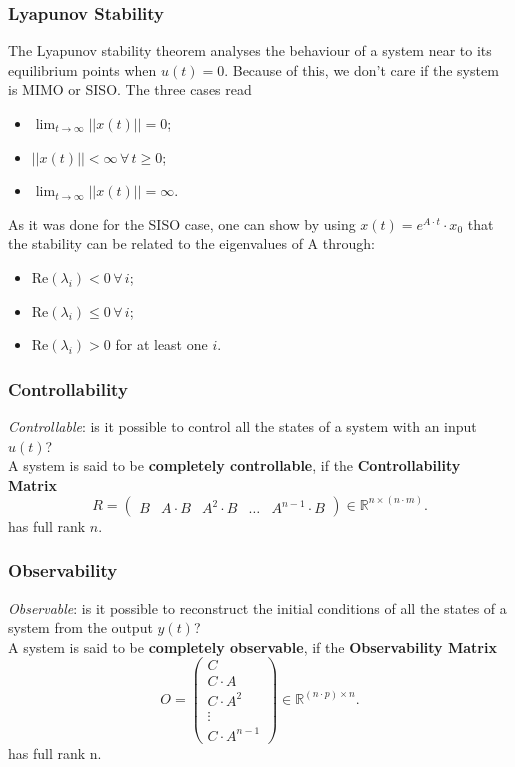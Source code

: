 \documentclass[a4paper,12 pt]{article}
\numberwithin{equation}{section}
\theoremstyle{definition}
\theoremstyle{remark}
\theoremstyle{definition}
\theoremstyle{definition}
\theoremstyle{definition}
\theoremstyle{remark}
\begin{document}
\subsubsection{Lyapunov Stability}
The Lyapunov stability theorem analyses the behaviour of a system near to its equilibrium points when $u(t)=0$. Because of this, we don't care if the system is MIMO or SISO. The three cases read
\begin{itemize}
\item {} $\lim_{t\rightarrow\infty}||x(t)||=0$;
\item {} $||x(t)||<\infty \,\forall\, t\geq 0$;
\item {} $\lim_{t\rightarrow\infty}||x(t)||=\infty$.
\end{itemize}
As it was done for the SISO case, one can show by using $x(t)=e^{A\cdot t}\cdot x_0$ that the stability can be related to the eigenvalues of A through:
\begin{itemize}
\item {} $\text{Re}(\lambda_i)<0\,\forall\,i$;
\item {} $\text{Re}(\lambda_i)\leq0\,\forall\,i$;
\item {} $\text{Re}(\lambda_i)>0$ for at least one $i$.
\end{itemize}
\subsubsection{Controllability}
\textit{Controllable}: is it possible to control all the states of a system with an input $u(t)$? \\
A system is said to be \textbf{completely controllable}, if the \textbf{Controllability Matrix}  \begin{equation}R=\begin{pmatrix} B & A\cdot B &A^2\cdot B &\hdots &A^{n-1} \cdot B \end{pmatrix} \in \mathbb{R}^{n\times(n\cdot m)}.\end{equation}
has full rank $n$.

  
\subsubsection{Observability}
  \textit{Observable}: is it possible to reconstruct the initial conditions of all the states of a system from the output $y(t)$? \\
A system is said to be \textbf{completely observable}, if the \textbf{Observability Matrix}  \begin{equation}O=\begin{pmatrix} C \\ C\cdot A \\ C\cdot A^2 \\ \vdots \\ C\cdot A^{n-1} \end{pmatrix} \in \mathbb{R}^{(n\cdot p)\times n}.\end{equation}
has full rank n. \\
\newpage
\end{document}

